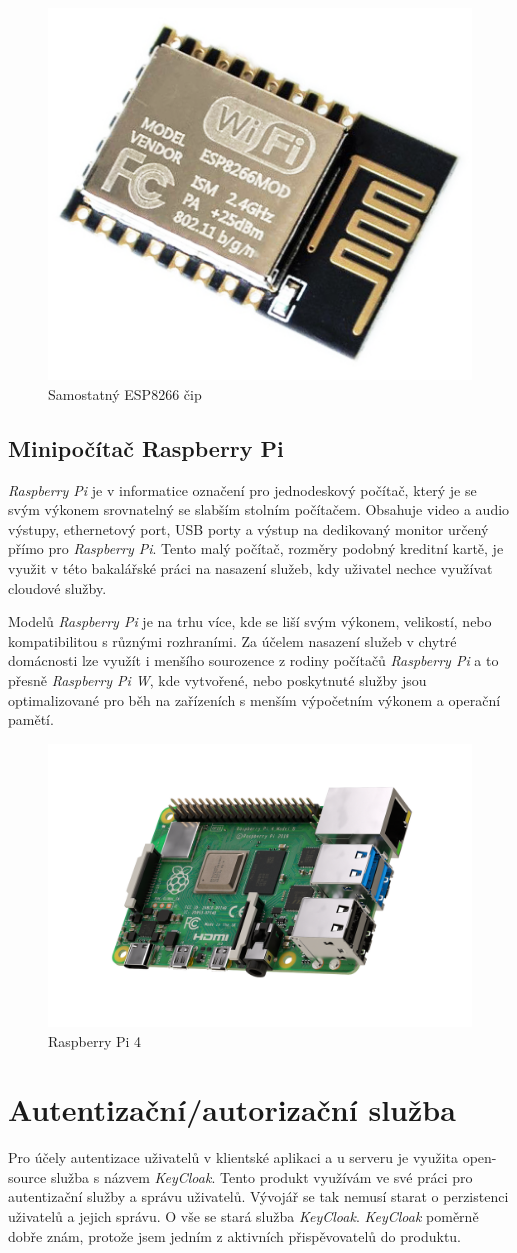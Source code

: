 \begin{figure}[hbt]
  \centering
  \includegraphics[width=.2 \linewidth]{obrazky-figures/esp_standalone.png}
  \caption{Samostatný ESP8266 čip}
  \label{figure:esp8266}
\end{figure}

\subsection*{Minipočítač Raspberry Pi}
\label{terminy:raspberry}

\emph{Raspberry Pi} je v informatice označení pro jednodeskový počítač, který je se svým výkonem srovnatelný se slabším stolním počítačem.
Obsahuje video a audio výstupy,
ethernetový port, USB porty a výstup na dedikovaný monitor určený přímo pro \emph{Raspberry Pi}.
Tento malý počítač, rozměry podobný kreditní kartě, je využit v této bakalářské práci na nasazení služeb, kdy uživatel nechce využívat cloudové služby.

Modelů \emph{Raspberry Pi} je na trhu více, kde se liší svým výkonem, velikostí, nebo kompatibilitou s různými rozhraními.
Za účelem nasazení služeb v chytré domácnosti lze využít i menšího sourozence z rodiny počítačů \emph{Raspberry Pi} a to přesně \emph{Raspberry Pi W},
kde vytvořené, nebo poskytnuté služby jsou optimalizované pro běh na zařízeních s menším výpočetním výkonem a operační pamětí.

\begin{figure}[ht]
  \centering
  \includegraphics[width=.5 \linewidth]{obrazky-figures/raspberry.png}
  \caption{Raspberry Pi 4}
\end{figure}

\newpage
\section{Autentizační/autorizační služba}
\label{pouzite:auth}
Pro účely autentizace uživatelů v klientské aplikaci a u serveru je využita open-source služba s názvem \emph{KeyCloak}.
Tento produkt využívám ve své práci pro autentizační služby a správu uživatelů.
Vývojář se tak nemusí starat o perzistenci uživatelů a jejich správu.
O vše se stará služba \emph{KeyCloak}.
\emph{KeyCloak} poměrně dobře znám, protože jsem jedním z aktivních přispěvovatelů do produktu.

